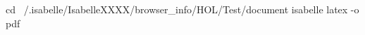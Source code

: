 \begin{isabellebody}
\begin{isamarkuptext}
\begin{ttbox}
  cd ~/.isabelle/IsabelleXXXX/browser_info/HOL/Test/document
  isabelle latex -o pdf
\end{ttbox}%
\end{isamarkuptext}%
\isamarkuptrue%
%
\isadelimtheory
%
\endisadelimtheory
%
\isatagtheory
{}\isamarkupfalse%
%
\endisatagtheory
{\isafoldtheory}%
%
\isadelimtheory
%
\endisadelimtheory
\end{isabellebody}%
